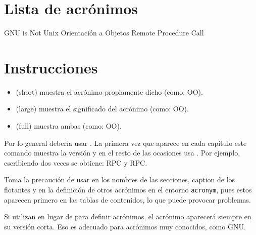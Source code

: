 \documentclass[a4paper, 11pt]{article}
\title{}
\begin{document}
\maketitle


\section{Lista de acrónimos}

{\small
\begin{acronym}[XXXXXXXX]
       {\acs{GNU} is Not Unix}
        {Orientación a Objetos}
       {Remote Procedure Call}
\end{acronym}
}


\section{Instrucciones}

\begin{itemize}
\item {} (short) muestra el acrónimo propiamente dicho (como: \acs{OO}).
\item {} (large) muestra el significado del acrónimo (como: \acl{OO}).
\item {} (full) muestra ambas (como: \acf{OO}).
\end{itemize}

Por lo general debería usar . La primera vez que aparece en cada capítulo este
comando muestra la versión  y en el resto de las ocasiones usa
. Por ejemplo, escribiendo dos veces  se obtiene: \ac{RPC} y
\ac{RPC}.

Toma la precaución de usar  en los nombres de las secciones, caption de los
flotantes y en la definición de otros acrónimos en el entorno \texttt{acronym}, pues estos
aparecen primero en las tablas de contenidos, lo que puede provocar problemas.

Si utilizan  en lugar de  para definir acrónimos, el acrónimo
aparecerá siempre en su versión corta. Eso es adecuado para acrónimos muy conocidos, como
\ac{GNU}.
\end{document}
